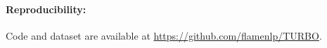 \paragraph{Reproducibility:} Code and dataset are available at \url{https://github.com/flamenlp/TURBO}.
    
